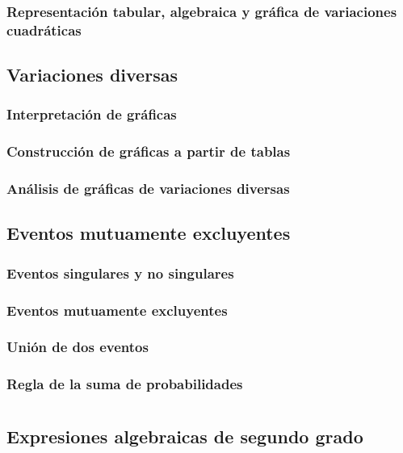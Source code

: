 \documentclass[11pt]{book}
\begin{document}
\subsection{Representación tabular, algebraica y gr\'afica de variaciones cuadráticas}

\section{Variaciones diversas}
\subsection{Interpretación de gr\'aficas}
\subsection{Construcción de gr\'aficas a partir de tablas}
\subsection{Análisis de gr\'aficas de variaciones diversas}

\section{Eventos mutuamente excluyentes}
\subsection{Eventos singulares y no singulares}
\subsection{Eventos mutuamente excluyentes}
\subsection{Unión de dos eventos}
\subsection{Regla de la suma de probabilidades}

\chapter{}

\section{Expresiones algebraicas de segundo grado}
\end{document}
